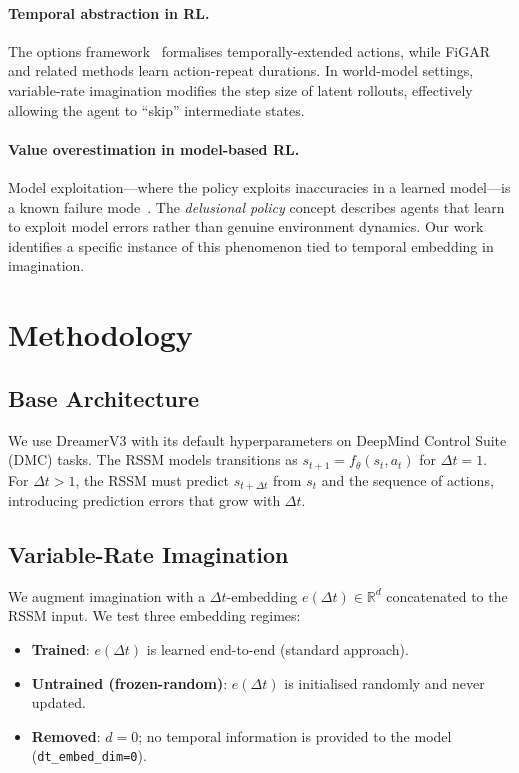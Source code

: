 \documentclass[letterpaper]{article}
\begin{document}
\paragraph{Temporal abstraction in RL.}
The options framework~\cite{sutton1999options} formalises temporally-extended actions, while FiGAR~\cite{sharma2017figar} and related methods learn action-repeat durations.
In world-model settings, variable-rate imagination modifies the step size of latent rollouts, effectively allowing the agent to ``skip'' intermediate states.

\paragraph{Value overestimation in model-based RL.}
Model exploitation---where the policy exploits inaccuracies in a learned model---is a known failure mode~\cite{janner2019mbpo}.
The \emph{delusional policy} concept describes agents that learn to exploit model errors rather than genuine environment dynamics.
Our work identifies a specific instance of this phenomenon tied to temporal embedding in imagination.

\section{Methodology}

\subsection{Base Architecture}

We use DreamerV3 with its default hyperparameters on DeepMind Control Suite (DMC) tasks.
The RSSM models transitions as $s_{t+1} = f_\theta(s_t, a_t)$ for $\Delta t{=}1$.
For $\Delta t{>}1$, the RSSM must predict $s_{t+\Delta t}$ from $s_t$ and the sequence of actions, introducing prediction errors that grow with $\Delta t$.

\subsection{Variable-Rate Imagination}

We augment imagination with a $\Delta t$-embedding $e(\Delta t) \in \mathbb{R}^d$ concatenated to the RSSM input.
We test three embedding regimes:
\begin{itemize}[nosep]
    \item \textbf{Trained}: $e(\Delta t)$ is learned end-to-end (standard approach).
    \item \textbf{Untrained (frozen-random)}: $e(\Delta t)$ is initialised randomly and never updated.
    \item \textbf{Removed}: $d=0$; no temporal information is provided to the model (\texttt{dt\_embed\_dim=0}).
\end{itemize}
\end{document}
